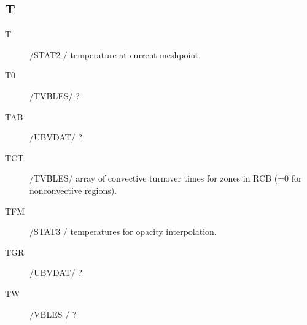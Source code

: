 \documentclass{article}
\begin{document}
\subsection*{T}
\begin{description}

	\item[T]		    /STAT2 / temperature at current meshpoint.

	\item[T0]      	/TVBLES/ ?
	 
	\item[TAB]     	/UBVDAT/ ?
	 
	\item[TCT]      	/TVBLES/ array of convective turnover times for zones in RCB (=0 for nonconvective regions).

	\item[TFM]     	/STAT3 / temperatures for opacity interpolation.

	\item[TGR]     	/UBVDAT/  ?
	
	\item[TW]      	/VBLES / ?
	 
\end{description}
\end{document}
